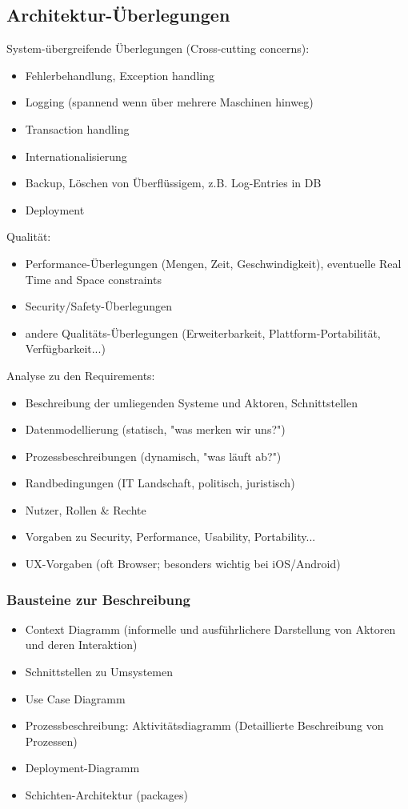 \subsection{Architektur-Überlegungen}
System-übergreifende Überlegungen (Cross-cutting concerns):
\begin{itemize}
	\item Fehlerbehandlung, Exception handling
	\item Logging (spannend wenn über mehrere Maschinen hinweg)
	\item Transaction handling
	\item Internationalisierung
	\item Backup, Löschen von Überflüssigem, z.B. Log-Entries in DB
	\item Deployment
\end{itemize}

Qualität:
\begin{itemize}
	\item Performance-Überlegungen (Mengen, Zeit, Geschwindigkeit), eventuelle Real Time and Space constraints
	\item Security/Safety-Überlegungen
	\item andere Qualitäts-Überlegungen (Erweiterbarkeit, Plattform-Portabilität, Verfügbarkeit...)
\end{itemize}

Analyse zu den Requirements:
\begin{itemize}
	\item Beschreibung der umliegenden Systeme und Aktoren, Schnittstellen
	\item Datenmodellierung (statisch, "was merken wir uns?")
	\item Prozessbeschreibungen (dynamisch, "was läuft ab?")
	\item Randbedingungen (IT Landschaft, politisch, juristisch)
	\item Nutzer, Rollen \& Rechte
	\item Vorgaben zu Security, Performance, Usability, Portability...
	\item UX-Vorgaben (oft Browser; besonders wichtig bei iOS/Android)
\end{itemize}


\subsubsection{Bausteine zur Beschreibung}

\begin{itemize}
	\item Context Diagramm (informelle und ausführlichere Darstellung von Aktoren und deren Interaktion)
	\item Schnittstellen zu Umsystemen
	\item Use Case Diagramm
	\item Prozessbeschreibung: Aktivitätsdiagramm (Detaillierte Beschreibung von Prozessen)
	\item Deployment-Diagramm
	\item Schichten-Architektur (packages)
\end{itemize}

